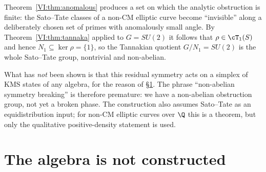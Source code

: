 \begin{remark}\label{VI:rem:anomalouswarn}
Theorem~\ref{VI:thm:anomalous} produces a set on which the analytic obstruction is finite: the
Sato--Tate classes of a non-CM elliptic curve become ``invisible'' along a deliberately
chosen set of primes with anomalously small angle. By Theorem~\ref{VI:thm:tannaka} applied to
$G=SU(2)$ it follows that $\rho\in\cT_1(S)$ and hence $N_1\subseteq\ker\rho=\{1\}$, so the
Tannakian quotient $G/N_1=SU(2)$ is the whole Sato--Tate group, nontrivial and
non-abelian.

What has \emph{not} been shown is that this residual symmetry acts on a simplex of
$\mathrm{KMS}$ states of any algebra, for the reason of \S\ref{VI:sec:algebra}. The phrase
``non-abelian symmetry breaking'' is therefore premature: we have a non-abelian obstruction
group, not yet a broken phase. The construction also assumes Sato--Tate as an
equidistribution input; for non-CM elliptic curves over $\Q$ this is a theorem, but only the
qualitative positive-density statement is used.
\end{remark}

\section{The algebra is not constructed}\label{VI:sec:algebra}

